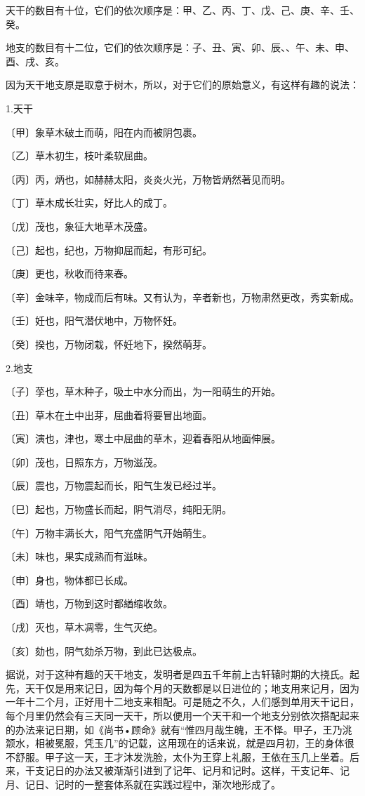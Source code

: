 \documentclass[a5paper,oneside,12pt]{ctexbook}
\begin{document}
天干的数目有十位，它们的依次顺序是：甲、乙、丙、丁、戊、己、庚、辛、壬、癸。

地支的数目有十二位，它们的依次顺序是：子、丑、寅、卯、辰、、午、未、申、酉、戌、亥。

因为天干地支原是取意于树木，所以，对于它们的原始意义，有这样有趣的说法：

1.天干

〔甲〕象草木破土而萌，阳在内而被阴包裹。

〔乙〕草木初生，枝叶柔软屈曲。

〔丙〕丙，炳也，如赫赫太阳，炎炎火光，万物皆炳然著见而明。

〔丁〕草木成长壮实，好比人的成丁。

〔戊〕茂也，象征大地草木茂盛。

〔己〕起也，纪也，万物抑屈而起，有形可纪。

〔庚〕更也，秋收而待来春。

〔辛〕金味辛，物成而后有味。又有认为，辛者新也，万物肃然更改，秀实新成。

〔壬〕妊也，阳气潜伏地中，万物怀妊。

〔癸〕揆也，万物闭栽，怀妊地下，揆然萌芽。

2.地支

〔子〕莩也，草木种子，吸土中水分而出，为一阳萌生的开始。

〔丑〕草木在土中出芽，屈曲着将要冒出地面。

〔寅〕演也，津也，寒土中屈曲的草木，迎着春阳从地面伸展。

〔卯〕茂也，日照东方，万物滋茂。

〔辰〕震也，万物震起而长，阳气生发已经过半。

〔巳〕起也，万物盛长而起，阴气消尽，纯阳无阴。

〔午〕万物丰满长大，阳气充盛阴气开始萌生。

〔未〕味也，果实成熟而有滋味。

〔申〕身也，物体都已长成。

〔酉〕靖也，万物到这时都緧缩收敛。

〔戌〕灭也，草木凋零，生气灭绝。

〔亥〕劾也，阴气劾杀万物，到此已达极点。

据说，对于这种有趣的天干地支，发明者是四五千年前上古轩辕时期的大挠氏。起先，天干仅是用来记日，因为每个月的天数都是以日进位的；地支用来记月，因为一年十二个月，正好用十二地支来相配。可是随之不久，人们感到单用天干记日，每个月里仍然会有三天同一天干，所以便用一个天干和一个地支分别依次搭配起来的办法来记日期，如《尚书•顾命》就有“惟四月哉生魄，王不怿。甲子，王乃洮颒水，相被冕服，凭玉几”的记载，这用现在的话来说，就是四月初，王的身体很不舒服。甲子这一天，王才沐发洗脸，太仆为王穿上礼服，王依在玉几上坐着。后来，干支记日的办法又被渐渐引进到了记年、记月和记时。这样，干支记年、记月、记日、记时的一整套体系就在实践过程中，渐次地形成了。
\end{document}
